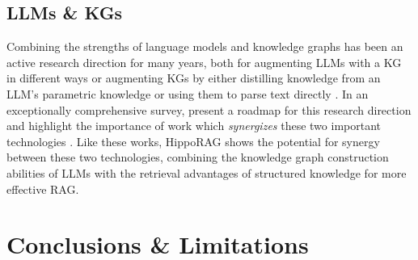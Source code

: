 \documentclass{article}
\begin{document}
\subsection{LLMs \& KGs} 

Combining the strengths of language models and knowledge graphs has been an active research direction for many years, both for augmenting LLMs with a KG in different ways \cite{luo2024reasoning, wang2023boosting, wen2023mindmap} or augmenting KGs by either distilling knowledge from an LLM's parametric knowledge \cite{bosselut-etal-2019-comet, west-etal-2022-symbolic} or using them to parse text directly \cite{autokg, han2023pive,zhang-etal-2023-aligning}. In an exceptionally comprehensive survey, \citet{kg_and_llm} present a roadmap for this research direction and highlight the importance of work which \textit{synergizes} these two important technologies \cite{jiang-etal-2023-structgpt, sun2024thinkongraph, gu-etal-2023-dont, yasunaga2022dragon, ZHU2023119369}. Like these works, HippoRAG shows the potential for synergy between these two technologies, combining the knowledge graph construction abilities of LLMs with the retrieval advantages of structured knowledge for more effective RAG.


\section{Conclusions \& Limitations}
\label{conclusions_limitations}
\end{document}
